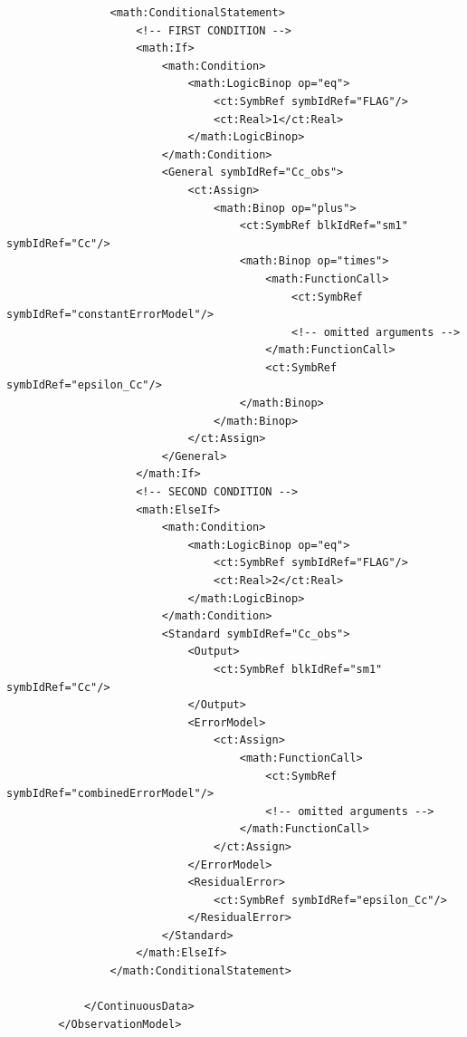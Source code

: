 \begin{lstlisting}
                <math:ConditionalStatement>
                    <!-- FIRST CONDITION -->
                    <math:If>
                        <math:Condition>
                            <math:LogicBinop op="eq">
                                <ct:SymbRef symbIdRef="FLAG"/>
                                <ct:Real>1</ct:Real>
                            </math:LogicBinop>
                        </math:Condition>
                        <General symbIdRef="Cc_obs">
                            <ct:Assign>
                                <math:Binop op="plus">
                                    <ct:SymbRef blkIdRef="sm1" symbIdRef="Cc"/>
                                    <math:Binop op="times">
                                        <math:FunctionCall>
                                            <ct:SymbRef symbIdRef="constantErrorModel"/>
                                            <!-- omitted arguments -->
                                        </math:FunctionCall>
                                        <ct:SymbRef symbIdRef="epsilon_Cc"/>
                                    </math:Binop>
                                </math:Binop>
                            </ct:Assign>
                        </General>
                    </math:If>
                    <!-- SECOND CONDITION -->
                    <math:ElseIf>
                        <math:Condition>
                            <math:LogicBinop op="eq">
                                <ct:SymbRef symbIdRef="FLAG"/>
                                <ct:Real>2</ct:Real>
                            </math:LogicBinop>
                        </math:Condition>
                        <Standard symbIdRef="Cc_obs">
                            <Output>
                                <ct:SymbRef blkIdRef="sm1" symbIdRef="Cc"/>
                            </Output>
                            <ErrorModel>
                                <ct:Assign>
                                    <math:FunctionCall>
                                        <ct:SymbRef symbIdRef="combinedErrorModel"/>
                                        <!-- omitted arguments -->
                                    </math:FunctionCall>
                                </ct:Assign>
                            </ErrorModel>
                            <ResidualError>
                                <ct:SymbRef symbIdRef="epsilon_Cc"/>
                            </ResidualError>
                        </Standard>
                    </math:ElseIf>
                </math:ConditionalStatement>
                
            </ContinuousData>
        </ObservationModel>
\end{lstlisting}


